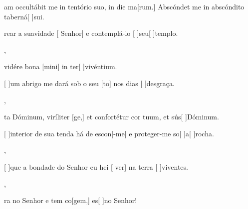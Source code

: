 {  {\item {}am occultábit me in tentório suo, in die ma[\-rum.] Abscóndet me in abscóndito taberná[ ]{su}i.}%
    {\item {}rear a suavidade [ Senhor] e contemplá-lo [ ]{seu}[ ]{tem}plo.},
  {\item {} vidére bona [mini] in ter[ ]{vi}{vén}tium.}%
    {\item {}[ ]{um} abrigo me dará sob o seu [to] nos dias [ ]{des}{gra}ça.},
  {\item {}ta Dóminum, viríliter [ge,] et confor\-té\-tur cor tu\-um, et sús[ ]{Dó}minum.}%
    {\item {}[ ]{in}terior de sua tenda há de escon[-me] e proteger-me so[ ]{a}[ ]{ro}cha.},
  {}%
    {\item {}[ ]{que} a bondade do Senhor eu hei [ ver] na terra [ ]{vi}{ven}tes.},
  {}%
    {\item {}ra no Senhor e tem co[gem,] es[ ]{no} Senhor!}
}